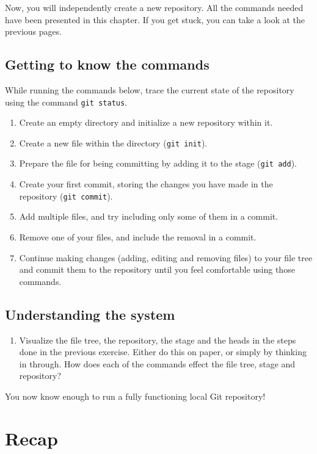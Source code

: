\documentclass[../main/git_course_main.tex]{subfiles}
\begin{document}
	Now, you will independently create a new repository. All the commands needed have been presented in this chapter. If you get stuck, you can take a look at the previous pages.
	
	\subsection{Getting to know the commands}
	
	While running the commands below, trace the current state of the repository using the command \verb$git status$.
	
	\begin{enumerate}
		\item Create an empty directory and initialize a new repository within it.
		\item Create a new file within the directory (\verb$git init$).
		\item Prepare the file for being committing by adding it to the stage (\verb$git add$).
		\item Create your first commit, storing the changes you have made in the repository (\verb$git commit$).
		\item Add multiple files, and try including only some of them in a commit.
		\item Remove one of your files, and include the removal in a commit.
		\item Continue making changes (adding, editing and removing files) to your file tree and commit them to the repository until you feel comfortable using those commands.
	\end{enumerate}
	
	\subsection{Understanding the system}
	
	\begin{enumerate}
		\item Visualize the file tree, the repository, the stage and the heads in the steps done in the previous exercise. Either do this on paper, or simply by thinking in through. How does each of the commands effect the file tree, stage and repository?
	\end{enumerate}
	
	You now know enough to run a fully functioning local Git repository!
	
	\newpage
	\section{Recap}
	
\end{document}
